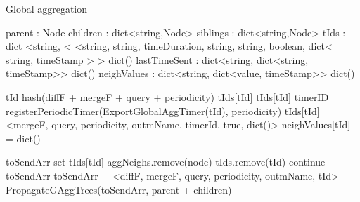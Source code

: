 \begin{algorithm}
    \caption{Global aggregation} \label{alg:mon:global_agg}
    \begin{algorithmic}[1]

    \asdstate \label{alg:mon:global_agg:state_start}
        \State parent : Node  
        \State children : dict<string,Node>  
        \State siblings : dict<string,Node>   
        \State tIds : dict <string, < <string, string, timeDuration, string, string, boolean, dict< string, timeStamp > > \asdassign dict()
        \State lastTimeSent : dict<string, dict<string, timeStamp>> \asdassign dict()
        \State neighValues : dict<string, dict<value, timeStamp>> \asdassign dict() \label{alg:mon:global_agg:state_end}
    \asdend

    \label{alg:mon:global_agg:start_req}
        \State tId \asdassign hash(diffF + mergeF + query + periodicity) 
            \State <diffF, mergeF, query, periodicity, outmName, timerId, isLocal, aggNeighs> \asdassign tIds[tId]
            \State tIds[tId] \asdassign <mergeF, query, periodicity, outmName, timerId, true, aggNeighs>
        \Else
            \State timerID \asdassign registerPeriodicTimer(ExportGlobalAggTimer(tId), periodicity)
            \State tIds[tId] \asdassign <mergeF, query, periodicity, outmName, timerId, true, dict()>
            \State neighValues[tId] = dict()
            \State
        \EndIf
    \asdend

     \label{alg:mon:global_agg:propag}
        \State toSendArr \asdassign set \label{alg:mon:global_agg:propag_start}
            \State <diffF, mergeF, query, periodicity, outmName, timerId, isLocal, aggNeighs> \asdassign tIds[tId]
                    \State aggNeighs.remove(node)
                \EndIf
            \EndFor
                \State tIds.remove(tId)
                \State continue
            \EndIf
                \State toSendArr \asdassign toSendArr + <diffF, mergeF, query, periodicity, outmName, tId>
            \EndIf
        \EndFor
        \State PropagateGAggTrees(toSendArr, parent + children) \label{alg:mon:global_agg:propag_end}
    \asdend


\end{algorithmic}
\end{algorithm}
